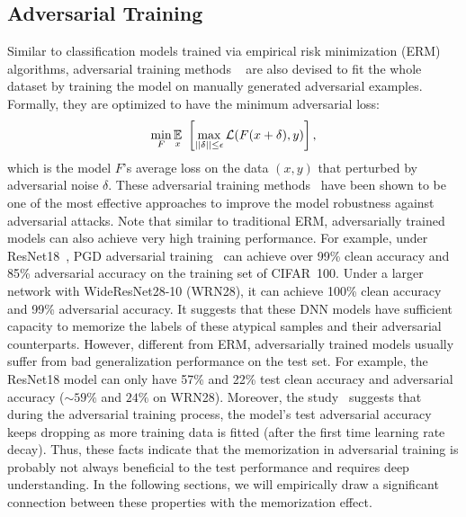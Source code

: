 \vspace{-0.2cm}
\subsection{Adversarial Training}
Similar to classification models trained via empirical risk minimization (ERM) algorithms, adversarial training methods
~\cite{madry2017towards, kurakin2016adversarial} are also devised to fit the whole dataset by training the model on manually generated adversarial examples. Formally, they are optimized to have the minimum adversarial loss:
\begin{align}
    \min_F \underset{x}{\mathbb{E}}~  \left[\max_{||\delta||\leq\epsilon} \mathcal{L}(F(x+\delta),y)\right],
    \label{eq:adv_training}
\end{align}
which is the model $F$'s average loss on the data $(x,y)$ that perturbed by adversarial noise $\delta$.
These adversarial training methods~\cite{kurakin2016adversarial, madry2017towards, zhang2019theoretically} have been shown to be one of the most effective approaches to improve the model robustness against adversarial attacks. Note that similar to traditional ERM, adversarially trained models can also achieve very high training performance. For example, under ResNet18~\cite{he2016deep}, PGD adversarial training~\cite{he2016deep} can achieve over 99\% clean accuracy and 85\% adversarial accuracy on the training set of CIFAR~100. Under a larger network with WideResNet28-10 (WRN28), it can achieve 100\% clean accuracy and 99\% adversarial accuracy. It suggests that these DNN models have sufficient capacity to memorize the labels of these atypical samples and their adversarial counterparts. However, different from ERM, adversarially trained models usually suffer from bad generalization performance on the test set. For example, the ResNet18 model can only have 57\% and 22\% test clean accuracy and adversarial accuracy ($\sim59\%$ and $24\%$ on WRN28). Moreover, the study~\cite{rice2020overfitting} suggests that during the adversarial training process, the model's test adversarial accuracy keeps dropping as more training data is fitted (after the first time learning rate decay). Thus, these facts indicate that the memorization in adversarial training is probably not always beneficial to the test performance and requires deep understanding. In the following sections, we will empirically draw a significant connection between these properties with the memorization effect.